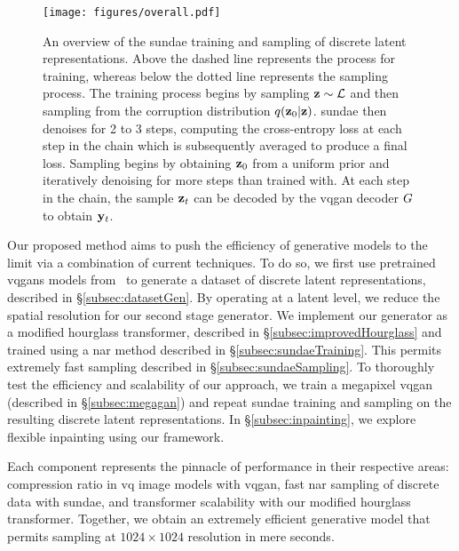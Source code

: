 
\begin{figure}[ht]
    \centering
    \texttt{[image: figures/overall.pdf]}
    \caption{
        An overview of the \gls{sundae} training and sampling of discrete latent
        representations. Above the dashed line represents the process for
        training, whereas below the dotted line represents the sampling process.
        The training process begins by sampling $\mathbf{z} \sim \mathcal{L}$
        and then sampling from the corruption distribution $q(\mathbf{z}_0 \vert
        \mathbf{z})$. \Gls{sundae} then denoises for 2 to 3 steps, computing the
        cross-entropy loss at each step in the chain which is subsequently
        averaged to produce a final loss. Sampling begins by obtaining $\mathbf{z}_0$
        from a uniform prior and iteratively denoising for more steps than
        trained with. At each step in the chain, the sample $\mathbf{z}_t$ can be
        decoded by the \gls{vqgan} decoder $G$ to obtain $\mathbf{y}_t$.
    }
    \label{fig:overall}
\end{figure}


Our proposed method aims to push the efficiency of generative models to the
limit via a combination of current techniques. To do so, we first use pretrained
\glspl{vqgan} models from~\cite{esser2021taming} to generate a dataset of
discrete latent representations, described in \S\ref{subsec:datasetGen}. By
operating at a latent level, we reduce the spatial resolution for our second
stage generator. We implement our generator as a modified hourglass transformer,
described in \S\ref{subsec:improvedHourglass} and trained using a \gls{nar}
method described in \S\ref{subsec:sundaeTraining}. This permits extremely fast
sampling described in \S\ref{subsec:sundaeSampling}. To thoroughly test the
efficiency and scalability of our approach, we train a megapixel \gls{vqgan}
(described in \S\ref{subsec:megagan}) and repeat \gls{sundae} training and
sampling on the resulting discrete latent representations. In
\S\ref{subsec:inpainting}, we explore flexible inpainting using our framework.

Each component represents the pinnacle of performance in their respective areas:
compression ratio in \gls{vq} image models with \gls{vqgan}, fast \acrlong{nar}
sampling of discrete data with \gls{sundae}, and transformer scalability with
our modified hourglass transformer. Together, we obtain an extremely efficient
generative model that permits sampling at $1024 \times 1024$ resolution in mere
seconds.

